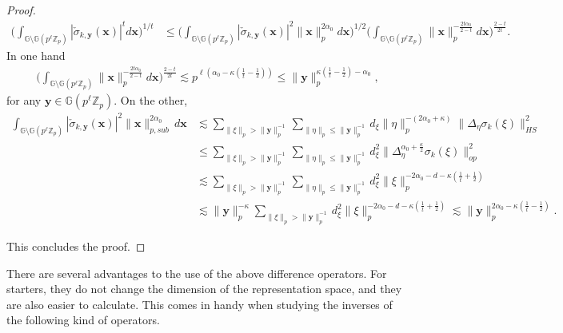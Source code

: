 \documentclass[12pt, reqno]{amsart}
\newcommand{\Z}{\mathbb{Z}}
\newcommand{\1}{\mathds{1}}
\newcommand{\G}{\mathbb{G}}
\begin{document}
\begin{proof}
\begin{align*}
    \Big( \int_{\G \setminus \G (p^\ell \Z_p)}|\check{\sigma}_{k,\mathbf{y}}(\mathbf{x})|^t d \mathbf{x} \Big)^{1/t} & \leq \Big(\int_{\G \setminus \G (p^\ell \Z_p)}|\check{\sigma}_{k,\mathbf{y}}(\mathbf{x})|^2 \| \mathbf{x}\|_p^{2 \alpha_0} d \mathbf{x} \Big)^{1/2} \Big( \int_{\G \setminus \G (p^\ell \Z_p)}\| \mathbf{x} \|_p^{-\frac{2t \alpha_0}{2-t}} d \mathbf{x} \Big)^{\frac{2-t}{2t}}.
\end{align*}In one hand 
\begin{align*}
    \Big( \int_{\G \setminus \G (p^\ell \Z_p)}\| \mathbf{x} \|_p^{-\frac{2t \alpha_0}{2-t}} d \mathbf{x} \Big)^{\frac{2-t}{2t}} \lesssim p^{\ell(\alpha_0 - \kappa(\frac{1}{t}- \frac{1}{2}))} \leq \| \mathbf{y} \|_p^{ \kappa(\frac{1}{t}- \frac{1}{2}) - \alpha_0},
\end{align*}for any $\mathbf{y} \in \G (p^\ell \Z_p)$. On the other,  
\begin{align*}    
\int_{\G \setminus \G(p^\ell \mathbb{Z}_p)}
|\check{\sigma}_{k,\mathbf{y}}(\mathbf{x})|^2
\|\mathbf{x}\|_{p, sub}^{2 \alpha_0}
\,d\mathbf{x}
&\lesssim
\sum_{\|\xi\|_p > \|\mathbf{y}\|_p^{-1}}
\sum_{\|\eta\|_p \le \|\mathbf{y}\|_p^{-1}}
d_\xi  
\|\eta\|_p^{-(2\alpha_0+\kappa)}
\|\Delta_\eta\sigma_k(\xi)\|_{HS}^2
\\&\leq  \sum_{\|\xi\|_p > \|\mathbf{y}\|_p^{-1}}
\sum_{\|\eta\|_p \le \|\mathbf{y}\|_p^{-1}}
d_\xi^2 
\|\Delta_\eta^{\alpha_0 + \frac{\kappa}{2}}\sigma_k(\xi)\|_{op}^2 \\ & \lesssim \sum_{\|\xi\|_p > \|\mathbf{y}\|_p^{-1}}
\sum_{\|\eta\|_p \le \|\mathbf{y}\|_p^{-1}}
d_\xi^2  
\|\xi \|_p^{-2\alpha_0 -d - \kappa(\frac{1}{t} + \frac{1}{2})} \\ &\lesssim \|\mathbf{y}\|_p^{-\kappa} \sum_{\|\xi\|_p > \|\mathbf{y}\|_p^{-1}} d_\xi^2  
\|\xi \|_p^{-2\alpha_0 -d- \kappa(\frac{1}{t} + \frac{1}{2})}  \lesssim \|\mathbf{y}\|_p^{2 \alpha_0 -\kappa(\frac{1}{t} - \frac{1}{2})} .
\end{align*}

This concludes the proof.




\end{proof}




There are several advantages to the use of the above difference operators. For starters, they do not change the dimension of the representation space, and they are also easier to calculate. This comes in handy when studying the inverses of the following kind of operators.
\end{document}

